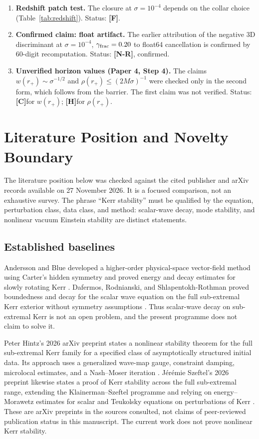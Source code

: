 \documentclass[11pt,a4paper]{article}
\newcommand{\VN}{\textcolor{vn}{\textbf{[N-R]}}}
\newcommand{\VH}{\textcolor{vh}{\textbf{[H]}}}
\newcommand{\CC}{\textcolor{cc}{\textbf{[C]}}}
\newcommand{\FF}{\textcolor{ff}{\textbf{[F]}}}
\theoremstyle{remark}
\theoremstyle{definition}
\begin{document}
\begin{enumerate}[leftmargin=*, label=E\arabic*.]
\item \textbf{Redshift patch test.} The closure at $\sigma = 10^{-4}$ depends on the collar choice (Table~\ref{tab:redshift}). Status: \FF.
\item \textbf{Confirmed claim: float artifact.} The earlier attribution of the negative $3$D discriminant at $\sigma=10^{-4}$, $\gamma_{\rm frac}=0.20$ to float64 cancellation is confirmed by 60-digit recomputation. Status: \VN, confirmed.
\item \textbf{Unverified horizon values (Paper 4, Step 4).} The claims $w(r_+)\sim\sigma^{-1/2}$ and $\rho(r_+)\le(2M\sigma)^{-1}$ were checked only in the second form, which follows from the barrier. The first claim was not verified. Status: \CC for $w(r_+)$; \VH for $\rho(r_+)$.
\end{enumerate}

\section{Literature Position and Novelty Boundary}
\label{sec:lit}

The literature position below was checked against the cited publisher and arXiv records available on 27 November 2026. It is a focused comparison, not an exhaustive survey. The phrase ``Kerr stability'' must be qualified by the equation, perturbation class, data class, and method: scalar-wave decay, mode stability, and nonlinear vacuum Einstein stability are distinct statements.

\subsection{Established baselines}

Andersson and Blue developed a higher-order physical-space vector-field method using Carter's hidden symmetry and proved energy and decay estimates for slowly rotating Kerr \cite{AnderssonBlue2015}. Dafermos, Rodnianski, and Shlapentokh-Rothman proved boundedness and decay for the scalar wave equation on the full sub-extremal Kerr exterior without symmetry assumptions \cite{DRS2016}. Thus scalar-wave decay on sub-extremal Kerr is not an open problem, and the present programme does not claim to solve it.

Peter Hintz's 2026 arXiv preprint states a nonlinear stability theorem for the full sub-extremal Kerr family for a specified class of asymptotically structured initial data. Its approach uses a generalized wave-map gauge, constraint damping, microlocal estimates, and a Nash--Moser iteration \cite{Hintz2026}. Jérémie Szeftel's 2026 preprint likewise states a proof of Kerr stability across the full sub-extremal range, extending the Klainerman--Szeftel programme and relying on energy--Morawetz estimates for scalar and Teukolsky equations on perturbations of Kerr \cite{Szeftel2026}. These are arXiv preprints in the sources consulted, not claims of peer-reviewed publication status in this manuscript. The current work does not prove nonlinear Kerr stability.
\end{document}
